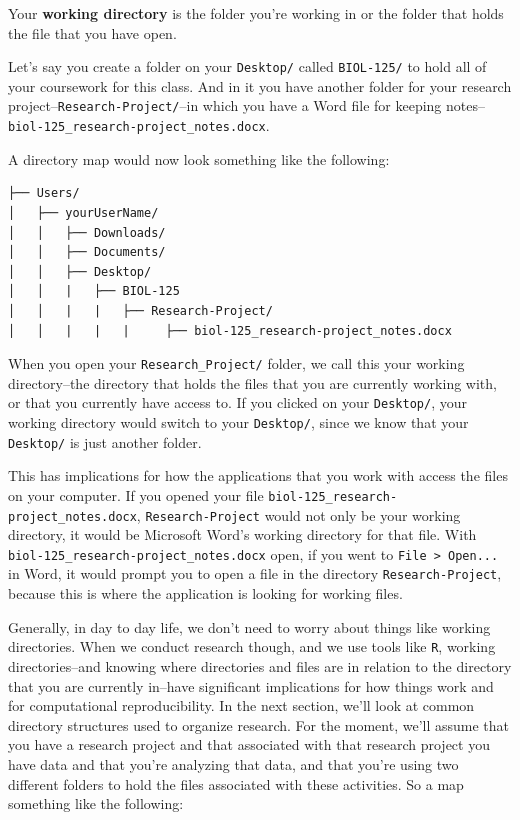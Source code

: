 \documentclass[
]{book}
\begin{document}
Your \textbf{working directory} is the folder you're working in or the folder that holds the file that you have open.

Let's say you create a folder on your \texttt{Desktop/} called \texttt{BIOL-125/} to hold all of your coursework for this class. And in it you have another folder for your research project--\texttt{Research-Project/}--in which you have a Word file for keeping notes--\texttt{biol-125\_research-project\_notes.docx}.

A directory map would now look something like the following:

\begin{verbatim}
├── Users/
│   ├── yourUserName/
│   │   ├── Downloads/
│   │   ├── Documents/
│   │   ├── Desktop/
│   │   |   ├── BIOL-125
│   │   |   |   ├── Research-Project/
│   │   |   |   |     ├── biol-125_research-project_notes.docx
\end{verbatim}

When you open your \texttt{Research\_Project/} folder, we call this your working directory--the directory that holds the files that you are currently working with, or that you currently have access to. If you clicked on your \texttt{Desktop/}, your working directory would switch to your \texttt{Desktop/}, since we know that your \texttt{Desktop/} is just another folder.

This has implications for how the applications that you work with access the files on your computer. If you opened your file \texttt{biol-125\_research-project\_notes.docx}, \texttt{Research-Project} would not only be your working directory, it would be Microsoft Word's working directory for that file. With \texttt{biol-125\_research-project\_notes.docx} open, if you went to \texttt{File\ \textgreater{}\ Open...} in Word, it would prompt you to open a file in the directory \texttt{Research-Project}, because this is where the application is looking for working files.

Generally, in day to day life, we don't need to worry about things like working directories. When we conduct research though, and we use tools like \texttt{R}, working directories--and knowing where directories and files are in relation to the directory that you are currently in--have significant implications for how things work and for computational reproducibility.
In the next section, we'll look at common directory structures used to organize research. For the moment, we'll assume that you have a research project and that associated with that research project you have data and that you're analyzing that data, and that you're using two different folders to hold the files associated with these activities. So a map something like the following:
\end{document}
